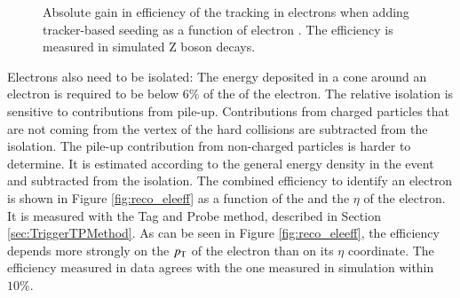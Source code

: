 \begin{figure}[htbp!]
  \begin{center}
\caption{Absolute gain in efficiency of the tracking in electrons when adding tracker-based seeding as a function of electron \pt\cite{Sirunyan:2017ulk}. 
         The efficiency is measured in simulated Z boson decays.
  \label{fig:reco_eletrackseed}}
  \end{center}
\end{figure}

Electrons also need to be isolated: The energy deposited in a cone around an electron is required to be below 6\% of the \pt of the electron.
The relative isolation is sensitive to contributions from pile-up. Contributions from charged particles that are not coming from the vertex of the hard collisions
are subtracted from the isolation. The pile-up contribution from non-charged particles is harder to determine. It is estimated according to the general energy density
in the event and subtracted from the isolation.
The combined efficiency to identify an electron is shown in Figure \ref{fig:reco_eleeff} as a function of the \pt and the $\eta$ of the electron.
It is measured with the Tag and Probe method, described in Section \ref{sec:TriggerTPMethod}.
As can be seen in Figure \ref{fig:reco_eleeff}, the efficiency depends more strongly on the $p_{\mathrm{T}}$ of the electron than on its $\eta$ coordinate. 
The efficiency measured in data agrees with the one measured in simulation within $10\%$. 

